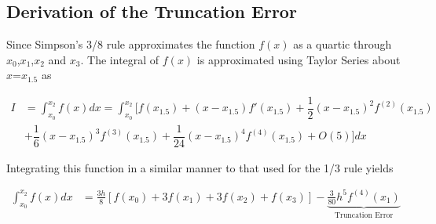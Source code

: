\documentclass[book.tex]{subfiles}
\begin{document}
\subsection{Derivation of the Truncation Error}
Since Simpson's 3/8 rule approximates the function $f(x)$ as a quartic through $x_0$,$x_1$,$x_2$ and $x_3$. The integral of $f(x)$ is approximated using Taylor Series about $x$=$x_{1.5}$ as	

\begin{align}
I &= \int_{x_0}^{x_2}f(x)dx = \int_{x_0}^{x_2}[f(x_{1.5}) + (x-x_{1.5})f'(x_{1.5}) + \dfrac{1}{2}(x-x_{1.5})^2f^{(2)}(x_{1.5}) \\
& + \dfrac{1}{6}(x-x_{1.5})^3f^{(3)}(x_{1.5}) + \dfrac{1}{24}(x-x_{1.5})^4f^{(4)}(x_{1.5}) + O(5)]dx
\end{align}

Integrating this function in a similar manner to that used for the 1/3 rule yields

\begin{align}
\int_{x_0}^{x_2}f(x)dx &=  \frac{3h}{8}[f(x_0) + 3f(x_1) + 3f(x_2) + f(x_3)] - \underbrace{\frac{3}{80}h^5f^{(4)}(x_1)}_{\text{Truncation Error}}
\end{align}
\end{document}

